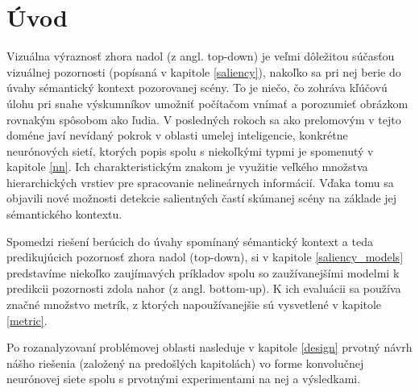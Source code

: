 \newpage
\section{Úvod}

Vizuálna výraznosť zhora nadol (z angl. top-down) je veľmi dôležitou súčasťou vizuálnej pozornosti (popísaná v kapitole \ref{saliency}), nakoľko sa pri nej berie do úvahy sémantický kontext pozorovanej scény. To je niečo, čo zohráva kľúčovú úlohu pri snahe výskumníkov umožniť počítačom vnímať a porozumieť obrázkom rovnakým spôsobom ako ľudia. V posledných rokoch sa ako prelomovým v tejto doméne javí nevídaný pokrok v oblasti umelej inteligencie, konkrétne neurónových sietí, ktorých popis spolu s niekoľkými typmi je spomenutý v kapitole \ref{nn}. Ich charakteristickým znakom je využitie veľkého množstva hierarchických vrstiev pre spracovanie nelineárnych informácií. Vďaka tomu sa objavili nové možnosti detekcie salientných častí skúmanej scény na základe jej sémantického kontextu.

Spomedzi riešení berúcich do úvahy spomínaný sémantický kontext a teda predikujúcich pozornosť zhora nadol (top-down), si v kapitole \ref{saliency_models} predstavíme niekoľko zaujímavých príkladov spolu so zaužívanejšími modelmi k predikcii pozornosti zdola nahor (z angl. bottom-up). K ich evaluácii sa používa značné množstvo metrík, z ktorých napoužívanejšie sú vysvetlené v kapitole \ref{metric}.

Po rozanalyzovaní problémovej oblasti nasleduje v kapitole \ref{design} prvotný návrh nášho riešenia (založený na predošlých kapitolách) vo forme konvolučnej neurónovej siete spolu  s prvotnými experimentami na nej a výsledkami.





